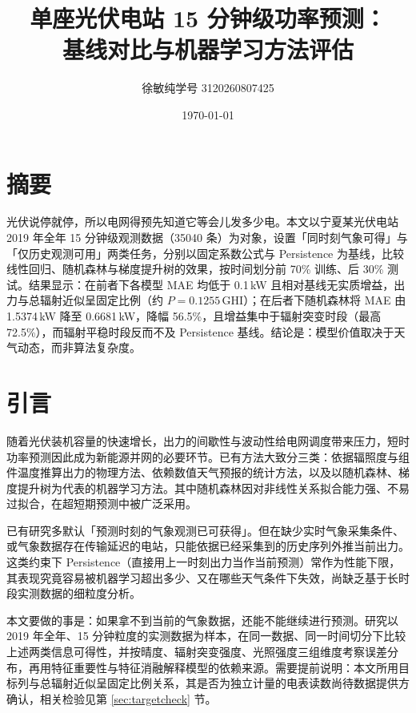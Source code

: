 \documentclass[11pt,a4paper]{ctexart}
\title{单座光伏电站 15 分钟级功率预测：\\基线对比与机器学习方法评估}
\author{徐敏纯\quad 学号 3120260807425}
\date{\today}
\begin{document}
\maketitle

\section{摘要}

光伏说停就停，所以电网得预先知道它等会儿发多少电。本文以宁夏某光伏电站 2019 年全年 15 分钟级观测数据（35040 条）为对象，设置「同时刻气象可得」与「仅历史观测可用」两类任务，分别以固定系数公式与 Persistence 为基线，比较线性回归、随机森林与梯度提升树的效果，按时间划分前 70\% 训练、后 30\% 测试。结果显示：在前者下各模型 MAE 均低于 0.1\,kW 且相对基线无实质增益，出力与总辐射近似呈固定比例（约 $P=0.1255\,\mathrm{GHI}$）；在后者下随机森林将 MAE 由 1.5374\,kW 降至 0.6681\,kW，降幅 56.5\%，且增益集中于辐射突变时段（最高 72.5\%），而辐射平稳时段反而不及 Persistence 基线。结论是：模型价值取决于天气动态，而非算法复杂度。

\section{引言}

随着光伏装机容量的快速增长，出力的间歇性与波动性给电网调度带来压力，短时功率预测因此成为新能源并网的必要环节\cite{antonanzas2016review}。已有方法大致分三类：依据辐照度与组件温度推算出力的物理方法、依赖数值天气预报的统计方法，以及以随机森林、梯度提升树为代表的机器学习方法\cite{inman2013solar,sobroi2018review}。其中随机森林因对非线性关系拟合能力强、不易过拟合，在超短期预测中被广泛采用\cite{yang2021improved}。

已有研究多默认「预测时刻的气象观测已可获得」。但在缺少实时气象采集条件、或气象数据存在传输延迟的电站，只能依据已经采集到的历史序列外推当前出力。这类约束下 Persistence（直接用上一时刻出力当作当前预测）常作为性能下限，其表现究竟容易被机器学习超出多少、又在哪些天气条件下失效，尚缺乏基于长时段实测数据的细粒度分析。

本文要做的事是：如果拿不到当前的气象数据，还能不能继续进行预测。研究以 2019 年全年、15 分钟粒度的实测数据为样本，在同一数据、同一时间切分下比较上述两类信息可得性，并按晴度、辐射突变强度、光照强度三组维度考察误差分布，再用特征重要性与特征消融解释模型的依赖来源。需要提前说明：本文所用目标列与总辐射近似呈固定比例关系，其是否为独立计量的电表读数尚待数据提供方确认，相关检验见第 \ref{sec:targetcheck} 节。
\end{document}
